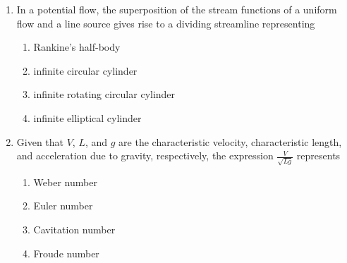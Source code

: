\documentclass[journal]{IEEEtran}
\begin{document}
\begin{enumerate}
{	}
    \item{
            In a potential flow, the superposition of the stream functions of a uniform flow and a line source gives rise to a dividing streamline representing
            
                
            \begin{multicols}{2}
                \begin{enumerate}
                	\item Rankine’s half-body
                	\item infinite circular cylinder
                	\item infinite rotating circular cylinder
                	\item infinite elliptical cylinder
                \end{enumerate}
            \end{multicols}

        
        }
    \item{
            Given that \(V\), \(L\), and \(g\) are the characteristic velocity, characteristic length, and acceleration due to gravity, respectively, the expression $
            \frac{V}{\sqrt{Lg}}
            $
            represents
          
            \begin{multicols}{2}
                \begin{enumerate}
                \item Weber number
                \item Euler number
                \item Cavitation number
                \item Froude number
                \end{enumerate}
            \end{multicols}
        
}
\end{enumerate}
\end{document}
